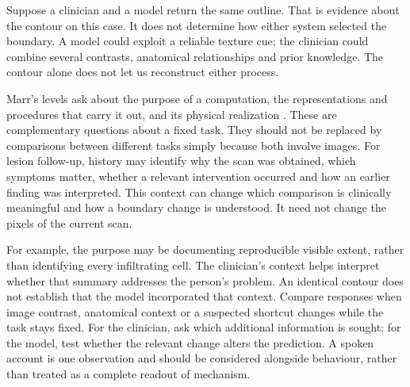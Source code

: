 \biomedicalanswer
{}
Suppose a clinician and a model return the same outline. That is evidence about the contour on this case. It does not determine how either system selected the boundary. A model could exploit a reliable texture cue; the clinician could combine several contrasts, anatomical relationships and prior knowledge. The contour alone does not let us reconstruct either process.

Marr's levels ask about the purpose of a computation, the representations and procedures that carry it out, and its physical realization \citep{marr2010}. These are complementary questions about a fixed task. They should not be replaced by comparisons between different tasks simply because both involve images.
For lesion follow-up, history may identify why the scan was obtained, which symptoms matter, whether a relevant intervention occurred and how an earlier finding was interpreted. This context can change which comparison is clinically meaningful and how a boundary change is understood. It need not change the pixels of the current scan.

For example, the purpose may be documenting reproducible visible extent, rather than identifying every infiltrating cell. The clinician's context helps interpret whether that summary addresses the person's problem. An identical contour does not establish that the model incorporated that context.
Compare responses when image contrast, anatomical context or a suspected shortcut changes while the task stays fixed. For the clinician, ask which additional information is sought; for the model, test whether the relevant change alters the prediction. A spoken account is one observation and should be considered alongside behaviour, rather than treated as a complete readout of mechanism.

